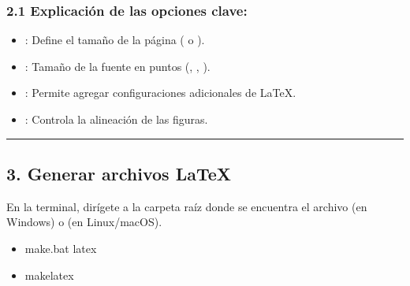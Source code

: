 \documentclass[a4paper,10pt,spanish]{sphinxmanual}
\begin{document}
\subsubsection{2.1 Explicación de las opciones clave:}
\label{\detokenize{configuracion_inicial/009.Generar_PDF:explicacion-de-las-opciones-clave}}\begin{itemize}
\item {} 
\sphinxAtStartPar
{}: Define el tamaño de la página ( o ).

\item {} 
\sphinxAtStartPar
{}: Tamaño de la fuente en puntos (\sphinxcode{\sphinxupquote{10pt}}, \sphinxcode{\sphinxupquote{11pt}}, \sphinxcode{\sphinxupquote{12pt}}).

\item {} 
\sphinxAtStartPar
{}: Permite agregar configuraciones adicionales de LaTeX.

\item {} 
\sphinxAtStartPar
{}: Controla la alineación de las figuras.

\end{itemize}


\bigskip\hrule\bigskip



\subsection{3. Generar archivos LaTeX}
\label{\detokenize{configuracion_inicial/009.Generar_PDF:generar-archivos-latex}}
\sphinxAtStartPar
En la terminal, dirígete a la carpeta raíz donde se encuentra el archivo  (en Windows) o  (en Linux/macOS).
\begin{itemize}
\item {} 
\sphinxAtStartPar
{}

\begin{sphinxVerbatim}[commandchars=\\\{\}]
make.bat latex
\end{sphinxVerbatim}

\item {} 
\sphinxAtStartPar
{}

\begin{sphinxVerbatim}[commandchars=\\\{\}]
makelatex
\end{sphinxVerbatim}

\end{itemize}
\end{document}
